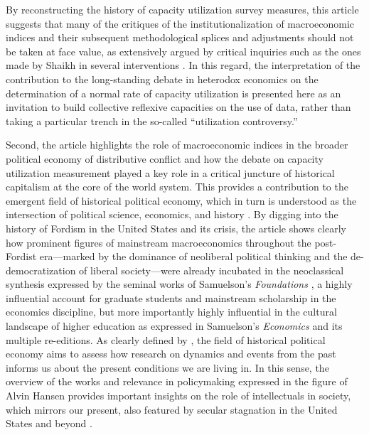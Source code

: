 \documentclass[11pt]{article}
\begin{document}
By reconstructing the history of capacity utilization survey measures, this article suggests that many of the critiques of the institutionalization of macroeconomic indices and their subsequent methodological splices and adjustments should not be taken at face value, as extensively argued by critical inquiries such as the ones made by Shaikh in several interventions \citep{shaikh1992,shaikhmoudud2004,shaikh2016}. In this regard, the interpretation of the contribution to the long-standing debate in heterodox economics on the determination of a normal rate of capacity utilization is presented here as an invitation to build collective reflexive capacities on the use of data, rather than taking a particular trench in the so-called ``utilization controversy.''

Second, the article highlights the role of macroeconomic indices in the broader political economy of distributive conflict and how the debate on capacity utilization measurement played a key role in a critical juncture of historical capitalism at the core of the world system. This provides a contribution to the emergent field of historical political economy, which in turn is understood as the intersection of political science, economics, and history \citep{jenkinsrubin2024hpe}. By digging into the history of Fordism in the United States and its crisis, the article shows clearly how prominent figures of mainstream macroeconomics throughout the post-Fordist era---marked by the dominance of neoliberal political thinking and the de-democratization of liberal society---were already incubated in the neoclassical synthesis expressed by the seminal works of Samuelson's \emph{Foundations} \citep{samuelson1947}, a highly influential account for graduate students and mainstream scholarship in the economics discipline, but more importantly highly influential in the cultural landscape of higher education as expressed in Samuelson's \emph{Economics} \citep{samuelson1948} and its multiple re-editions. As clearly defined by \citet{jenkinsrubin2024hpe}, the field of historical political economy aims to assess how research on dynamics and events from the past informs us about the present conditions we are living in. In this sense, the overview of the works and relevance in policymaking expressed in the figure of Alvin Hansen provides important insights on the role of intellectuals in society, which mirrors our present, also featured by secular stagnation in the United States and beyond \citep{cruztavani2023}.
\end{document}
